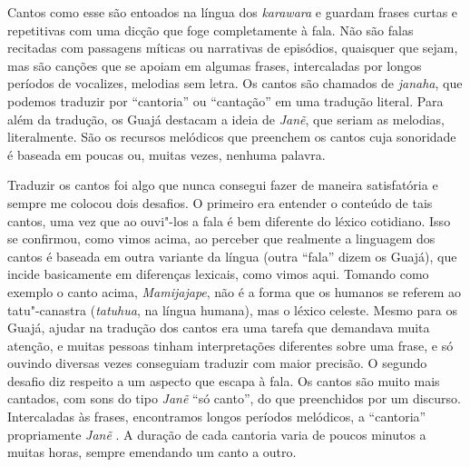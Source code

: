 Cantos como esse são entoados na língua dos \emph{karawara} e guardam
frases curtas e repetitivas com uma dicção que foge completamente à
fala. Não são falas recitadas com passagens míticas ou narrativas de
episódios, quaisquer que sejam, mas são canções que se apoiam em algumas
frases, intercaladas por longos períodos de vocalizes, melodias sem
letra. Os cantos são chamados de \emph{janaha}, que podemos traduzir por
``cantoria'' ou ``cantação'' em uma tradução literal. Para além da
tradução, os Guajá destacam a ideia de \emph{Janẽ}, que seriam as
melodias, literalmente. São os recursos melódicos que preenchem os
cantos cuja sonoridade é baseada em poucas ou, muitas vezes, nenhuma
palavra.

Traduzir os cantos foi algo que nunca consegui fazer de maneira
satisfatória e sempre me colocou dois desafios. O primeiro era entender
o conteúdo de tais cantos, uma vez que ao ouvi"-los a fala é bem
diferente do léxico cotidiano. Isso se confirmou, como vimos acima, ao
perceber que realmente a linguagem dos cantos é baseada em outra
variante da língua (outra ``fala'' dizem os Guajá), que incide basicamente
em diferenças lexicais, como vimos aqui. Tomando como exemplo o canto
acima, \emph{Mamijajape}, não é a forma que os humanos se referem ao
tatu"-canastra (\emph{tatuhua}, na língua humana), mas o léxico celeste.
Mesmo para os Guajá, ajudar na tradução dos cantos era uma tarefa que
demandava muita atenção, e muitas pessoas tinham interpretações
diferentes sobre uma frase, e só ouvindo diversas vezes conseguiam
traduzir com maior precisão. O segundo desafio diz respeito a um aspecto
que escapa à fala. Os cantos são muito mais cantados, com sons do tipo
\emph{Janẽ} ``só canto'', do que preenchidos por um discurso. Intercaladas
às frases, encontramos longos períodos melódicos, a ``cantoria''
propriamente \emph{Janẽ} . A duração de cada cantoria varia de poucos
minutos a muitas horas, sempre emendando um canto a outro.

